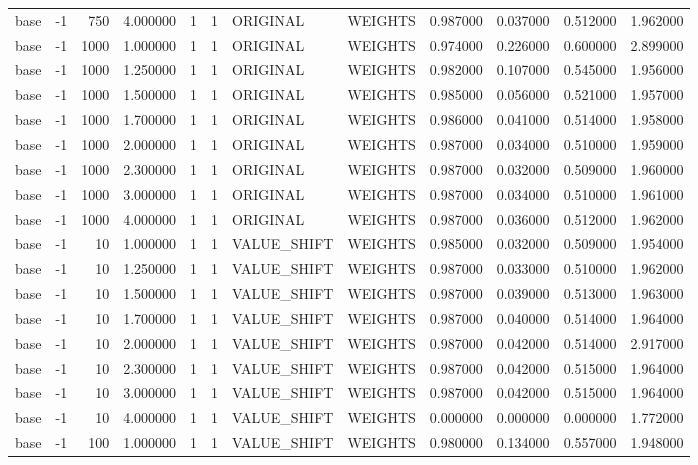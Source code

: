 \begin{tabular}{lrrrllllrrrr}
base & -1 & 750 & 4.000000 & 1 & 1 & ORIGINAL & WEIGHTS & 0.987000 & 0.037000 & 0.512000 & 1.962000 \\
base & -1 & 1000 & 1.000000 & 1 & 1 & ORIGINAL & WEIGHTS & 0.974000 & 0.226000 & 0.600000 & 2.899000 \\
base & -1 & 1000 & 1.250000 & 1 & 1 & ORIGINAL & WEIGHTS & 0.982000 & 0.107000 & 0.545000 & 1.956000 \\
base & -1 & 1000 & 1.500000 & 1 & 1 & ORIGINAL & WEIGHTS & 0.985000 & 0.056000 & 0.521000 & 1.957000 \\
base & -1 & 1000 & 1.700000 & 1 & 1 & ORIGINAL & WEIGHTS & 0.986000 & 0.041000 & 0.514000 & 1.958000 \\
base & -1 & 1000 & 2.000000 & 1 & 1 & ORIGINAL & WEIGHTS & 0.987000 & 0.034000 & 0.510000 & 1.959000 \\
base & -1 & 1000 & 2.300000 & 1 & 1 & ORIGINAL & WEIGHTS & 0.987000 & 0.032000 & 0.509000 & 1.960000 \\
base & -1 & 1000 & 3.000000 & 1 & 1 & ORIGINAL & WEIGHTS & 0.987000 & 0.034000 & 0.510000 & 1.961000 \\
base & -1 & 1000 & 4.000000 & 1 & 1 & ORIGINAL & WEIGHTS & 0.987000 & 0.036000 & 0.512000 & 1.962000 \\
base & -1 & 10 & 1.000000 & 1 & 1 & VALUE_SHIFT & WEIGHTS & 0.985000 & 0.032000 & 0.509000 & 1.954000 \\
base & -1 & 10 & 1.250000 & 1 & 1 & VALUE_SHIFT & WEIGHTS & 0.987000 & 0.033000 & 0.510000 & 1.962000 \\
base & -1 & 10 & 1.500000 & 1 & 1 & VALUE_SHIFT & WEIGHTS & 0.987000 & 0.039000 & 0.513000 & 1.963000 \\
base & -1 & 10 & 1.700000 & 1 & 1 & VALUE_SHIFT & WEIGHTS & 0.987000 & 0.040000 & 0.514000 & 1.964000 \\
base & -1 & 10 & 2.000000 & 1 & 1 & VALUE_SHIFT & WEIGHTS & 0.987000 & 0.042000 & 0.514000 & 2.917000 \\
base & -1 & 10 & 2.300000 & 1 & 1 & VALUE_SHIFT & WEIGHTS & 0.987000 & 0.042000 & 0.515000 & 1.964000 \\
base & -1 & 10 & 3.000000 & 1 & 1 & VALUE_SHIFT & WEIGHTS & 0.987000 & 0.042000 & 0.515000 & 1.964000 \\
base & -1 & 10 & 4.000000 & 1 & 1 & VALUE_SHIFT & WEIGHTS & 0.000000 & 0.000000 & 0.000000 & 1.772000 \\
base & -1 & 100 & 1.000000 & 1 & 1 & VALUE_SHIFT & WEIGHTS & 0.980000 & 0.134000 & 0.557000 & 1.948000 \\

\end{tabular}

